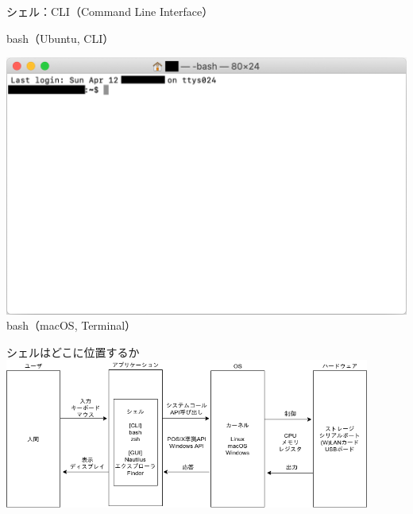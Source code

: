 \documentclass[12pt,aspectratio=169]{beamer}
\begin{document}
\begin{frame}{シェル：CLI（Command Line Interface）}
\begin{minipage}{0.3\textwidth}
    bash（Ubuntu, CLI）
  \end{minipage}
  \hfill
  \begin{minipage}{0.3\textwidth}
    \vspace{-5\baselineskip}
    \includegraphics[width=2.0\linewidth,bb=0 0 1144 735]{./images/mac-basic.png}
    bash（macOS, Terminal）
  \end{minipage}

\end{frame}


\begin{frame}{シェルはどこに位置するか}
  \centering
  \includegraphics[width=12cm,bb=0 0 741 281]{./images/shell.png}

\end{frame}
\end{document}
